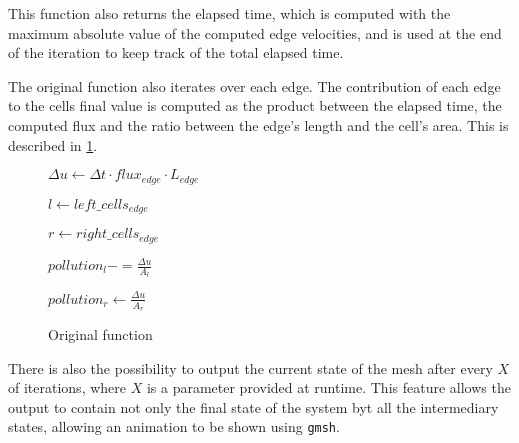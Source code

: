 This function also returns the elapsed time, which is computed with the maximum absolute value of the computed edge velocities, and is used at the end of the iteration to keep track of the total elapsed time.

The original \update function also iterates over each edge. The contribution of each edge to the cells final value is computed as the product between the elapsed time, the computed flux and the ratio between the edge's length and the cell's area. This is described in \cref{alg:update}.

\begin{figure}[!htp]
	\begin{alg}

			$\Delta{u} \gets \Delta{t} \cdot flux_{edge} \cdot L_{edge}$

			$l \gets left\_cells_{edge}$

			$r \gets right\_cells_{edge}$

			$pollution_{l} -= \frac{\Delta{u}}{A_{l}}$


				$pollution_{r} \gets \frac{\Delta{u}}{A_{r}}$
			\EndIf
		\EndFor
	\end{alg}

	\caption{Original \update function}
	\label{alg:update}
\end{figure}



There is also the possibility to output the current state of the mesh after every $X$ of iterations, where $X$ is a parameter provided at runtime. This feature allows the output to contain not only the final state of the system byt all the intermediary states, allowing  an animation to be shown using \texttt{gmsh}.


